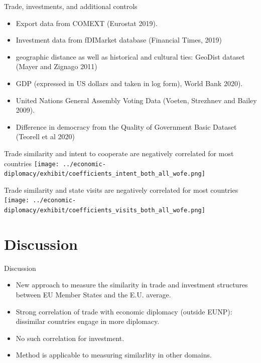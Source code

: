 \documentclass[
  ignorenonframetext,
  aspectratio=16,
]{beamer}
\providecommand{\tightlist}{%
  \setlength{\itemsep}{0pt}\setlength{\parskip}{0pt}}
\begin{document}
\begin{frame}{Trade, investments, and additional controls}
\protect\hypertarget{trade-investments-and-additional-controls}{}
\begin{itemize}
\tightlist
\item
  Export data from COMEXT (Eurostat 2019).
\item
  Investment data from fDIMarket database (Financial Times, 2019)
\item
  geographic distance as well as historical and cultural ties: GeoDist
  dataset (Mayer and Zignago 2011)
\item
  GDP (expressed in US dollars and taken in log form), World Bank 2020).
\item
  United Nations General Assembly Voting Data (Voeten, Strezhnev and
  Bailey 2009).
\item
  Difference in democracy from the Quality of Government Basic Dataset
  (Teorell et al 2020)
\end{itemize}
\end{frame}

\begin{frame}{Trade similarity and intent to cooperate are negatively
correlated for most countries}
\protect\hypertarget{trade-similarity-and-intent-to-cooperate-are-negatively-correlated-for-most-countries}{}
\texttt{[image: ../economic-diplomacy/exhibit/coefficients\_intent\_both\_all\_wofe.png]}
\end{frame}

\begin{frame}{Trade similarity and state visits are negatively
correlated for most countries}
\protect\hypertarget{trade-similarity-and-state-visits-are-negatively-correlated-for-most-countries}{}
\texttt{[image: ../economic-diplomacy/exhibit/coefficients\_visits\_both\_all\_wofe.png]}
\end{frame}

\hypertarget{discussion}{%
\section{Discussion}\label{discussion}}

\begin{frame}{Discussion}
\protect\hypertarget{discussion-1}{}
\begin{itemize}
\tightlist
\item
  New approach to measure the similarity in trade and investment
  structures between EU Member States and the E.U. average.
\item
  Strong correlation of trade with economic diplomacy (outside EUNP):
  dissimilar countries engage in more diplomacy.
\item
  No such correlation for investment.
\item
  Method is applicable to measuring similarlity in other domains.
\end{itemize}
\end{frame}
\end{document}
